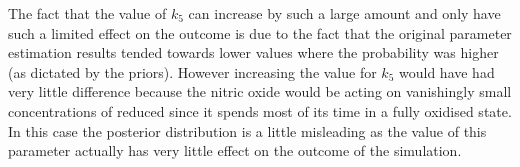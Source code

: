 The fact that the value of $k_5$ can increase by such a large amount and only have such a limited effect on the outcome is due to the fact that the original parameter estimation results tended towards lower values where the probability was higher (as dictated by the priors). However increasing the value for $k_5$ would have had very little difference because the nitric oxide would be acting on vanishingly small concentrations of reduced \cbbthree{} since it spends most of its time in a fully oxidised state. In this case the posterior distribution is a little misleading as the value of this parameter actually has very little effect on the outcome of the simulation.
